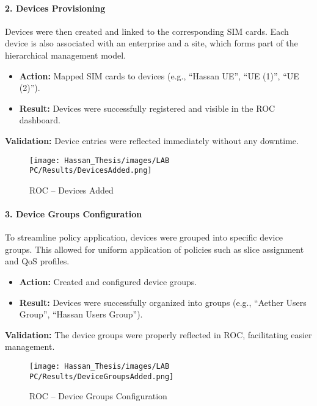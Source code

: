 \paragraph{2. Devices Provisioning}  
Devices were then created and linked to the corresponding SIM cards. Each device is also associated with an enterprise and a site, which forms part of the hierarchical management model.
\begin{itemize}
    \item \textbf{Action:} Mapped SIM cards to devices (e.g., “Hassan UE”, “UE (1)”, “UE (2)”).
    \item \textbf{Result:} Devices were successfully registered and visible in the ROC dashboard.
\end{itemize}
\textbf{Validation:} Device entries were reflected immediately without any downtime.  
\begin{figure}[ht]
  \centering
  \texttt{[image: Hassan\_Thesis/images/LAB PC/Results/DevicesAdded.png]}
  \caption{ROC – Devices Added}
  \label{fig:DevicesAdded}
\end{figure}

\paragraph{3. Device Groups Configuration}  
To streamline policy application, devices were grouped into specific device groups. This allowed for uniform application of policies such as slice assignment and QoS profiles.
\begin{itemize}
    \item \textbf{Action:} Created and configured device groups.
    \item \textbf{Result:} Devices were successfully organized into groups (e.g., “Aether Users Group”, “Hassan Users Group”).
\end{itemize}
\textbf{Validation:} The device groups were properly reflected in ROC, facilitating easier management.  
\begin{figure}[H]
  \centering
  \texttt{[image: Hassan\_Thesis/images/LAB PC/Results/DeviceGroupsAdded.png]}
  \caption{ROC – Device Groups Configuration}
  \label{fig:DeviceGroupsAdded}
\end{figure}

